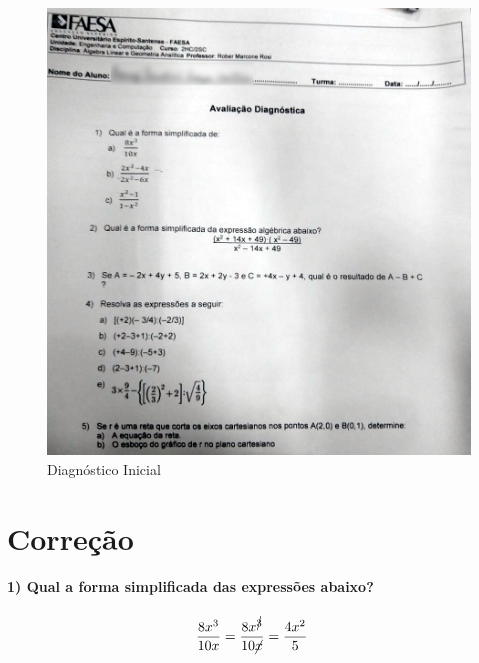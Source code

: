 \documentclass[pdftex, brazil, 12pt, oneside]{article}
\begin{document}
\begin{figure}[H]
  \begin{center}
    \caption{Diagnóstico Inicial}
    \label{fig:diagnostico-inicial}
    \includegraphics[scale=0.3]{imagens/diag_algebra.png}
  \end{center}
\end{figure}


\section{Correção}
\label{correcao}

\paragraph{1) Qual a forma simplificada das expressões abaixo?}

\begin{equation}
  \begin{split}
    \frac{8x^3}{10x} &= \frac{8x^{\cancel{3}}}{10\cancel{x}} = \frac{4x^2}{5}
  \end{split}
\end{equation}
\end{document}
